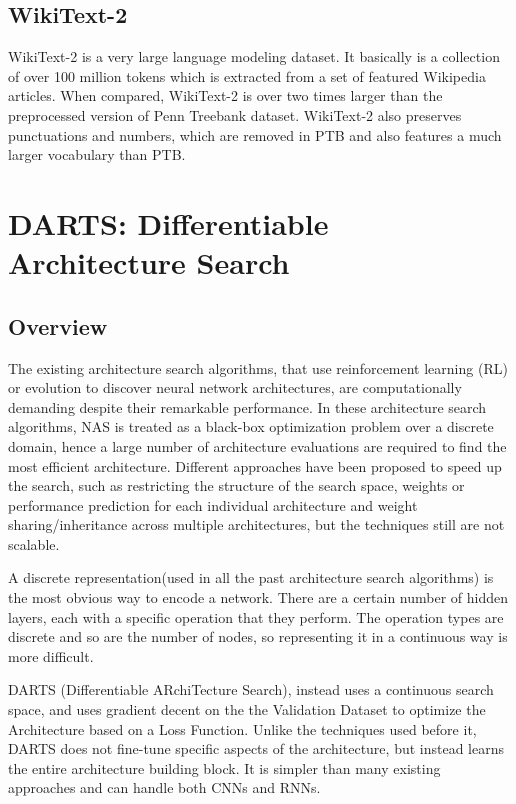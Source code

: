 \documentclass{ieee}
\begin{document}
\subsection{WikiText-2}
WikiText-2 is a very large language modeling dataset. It basically is a collection of over 100 million tokens which is extracted from a set of featured Wikipedia articles. When compared, WikiText-2 is over two times larger than the preprocessed version of Penn Treebank dataset. WikiText-2 also preserves punctuations and numbers, which are removed in PTB and also features a much larger vocabulary than PTB.

\section{DARTS: Differentiable Architecture Search}
\subsection{Overview}
The existing architecture search algorithms, that use reinforcement learning (RL) or evolution to discover neural network architectures, are computationally demanding despite their remarkable performance. In these architecture search algorithms, NAS is treated as a black-box optimization problem over a discrete domain, hence a large number of architecture evaluations are required to find the most efficient architecture. Different approaches have been proposed to speed up the search, such as restricting the structure of the search space, weights or performance prediction for each individual architecture and weight sharing/inheritance across multiple architectures, but the techniques still are not scalable. 

 A discrete representation(used in all the past architecture search algorithms) is the most obvious way to encode a network. There are a certain number of hidden layers, each with a specific operation that they perform. The operation types are discrete and so are the number of nodes, so representing it in a continuous way is more difficult. 

DARTS (Differentiable ARchiTecture Search), instead uses a continuous search space, and uses gradient decent on the the Validation Dataset to optimize the Architecture based on a Loss Function. Unlike the techniques used before it, DARTS does not fine-tune specific aspects of the architecture, but instead learns the entire architecture building block.  It is simpler than many existing approaches and can handle both CNNs and RNNs.
\end{document}
